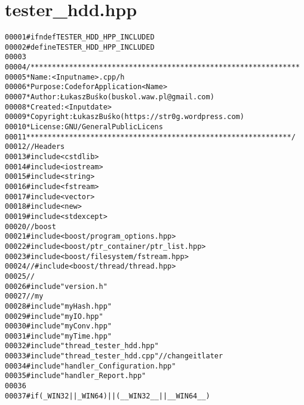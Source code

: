 \hypertarget{tester__hdd_8hpp_source}{
\section{tester\_\-hdd.hpp}
}


\begin{footnotesize}\begin{alltt}
00001 \textcolor{preprocessor}{#ifndef TESTER\_HDD\_HPP\_INCLUDED}
00002 \textcolor{preprocessor}{}\textcolor{preprocessor}{#define TESTER\_HDD\_HPP\_INCLUDED}
00003 \textcolor{preprocessor}{}
00004 \textcolor{comment}{/***************************************************************}
00005 \textcolor{comment}{ * Name:      <Input name>.cpp/h}
00006 \textcolor{comment}{ * Purpose:   Code for Application <Name>}
00007 \textcolor{comment}{ * Author:    Łukasz Buśko (buskol.waw.pl@gmail.com)}
00008 \textcolor{comment}{ * Created:   <Input date>}
00009 \textcolor{comment}{ * Copyright: Łukasz Buśko (https://str0g.wordpress.com)}
00010 \textcolor{comment}{ * License:   GNU / General Public Licens}
00011 \textcolor{comment}{ **************************************************************/}
00012 \textcolor{comment}{//Headers}
00013 \textcolor{preprocessor}{#include <cstdlib>}
00014 \textcolor{preprocessor}{#include <iostream>}
00015 \textcolor{preprocessor}{#include <string>}
00016 \textcolor{preprocessor}{#include <fstream>}
00017 \textcolor{preprocessor}{#include <vector>}
00018 \textcolor{preprocessor}{#include <new>}
00019 \textcolor{preprocessor}{#include <stdexcept>}
00020 \textcolor{comment}{//boost}
00021 \textcolor{preprocessor}{#include <boost/program\_options.hpp>}
00022 \textcolor{preprocessor}{#include <boost/ptr\_container/ptr\_list.hpp>}
00023 \textcolor{preprocessor}{#include <boost/filesystem/fstream.hpp>}
00024 \textcolor{comment}{//#include <boost/thread/thread.hpp>}
00025 \textcolor{comment}{//}
00026 \textcolor{preprocessor}{#include "version.h"}
00027 \textcolor{comment}{//my}
00028 \textcolor{preprocessor}{#include "myHash.hpp"}
00029 \textcolor{preprocessor}{#include "myIO.hpp"}
00030 \textcolor{preprocessor}{#include "myConv.hpp"}
00031 \textcolor{preprocessor}{#include "myTime.hpp"}
00032 \textcolor{preprocessor}{#include "thread\_tester\_hdd.hpp"}
00033 \textcolor{preprocessor}{#include "thread\_tester\_hdd.cpp"}\textcolor{comment}{//change it later}
00034 \textcolor{preprocessor}{#include "handler\_Configuration.hpp"}
00035 \textcolor{preprocessor}{#include "handler\_Report.hpp"}
00036 
00037 \textcolor{preprocessor}{#if ( \_WIN32 ||  \_WIN64) || ( \_\_WIN32\_\_ || \_\_WIN64\_\_ )}

\end{alltt}
\end{footnotesize}
